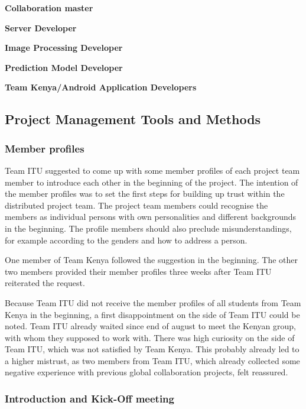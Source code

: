 \textbf{Collaboration master}

\textbf{Server Developer}

\textbf{Image Processing Developer}

\textbf{Prediction Model Developer}

\textbf{Team Kenya/Android Application Developers}



\subsection{Project Management Tools and Methods}

\subsubsection {Member profiles}
Team ITU suggested to come up with some member profiles of each project team member to introduce each other in the beginning of the project. The intention of the member profiles was to set the first steps for building up trust within the distributed project team. The project team members could recognise the members as individual persons with own personalities and different backgrounds in the beginning. The profile members should also preclude misunderstandings, for example according to the genders and how to address a person.

One member of Team Kenya followed the suggestion in the beginning. The other two members provided their member profiles three weeks after Team ITU reiterated the request.

Because Team ITU did not receive the member profiles of all students from Team Kenya in the beginning, a first disappointment on the side of Team ITU could be noted. Team ITU already waited since end of august to meet the Kenyan group, with whom they supposed to work with. There was high curiosity on the side of Team ITU, which was not satisfied by Team Kenya. This probably already led to a higher mistrust, as two members from Team ITU, which already collected some negative experience with previous global collaboration projects, felt reassured.

\subsubsection {Introduction and Kick-Off meeting}

